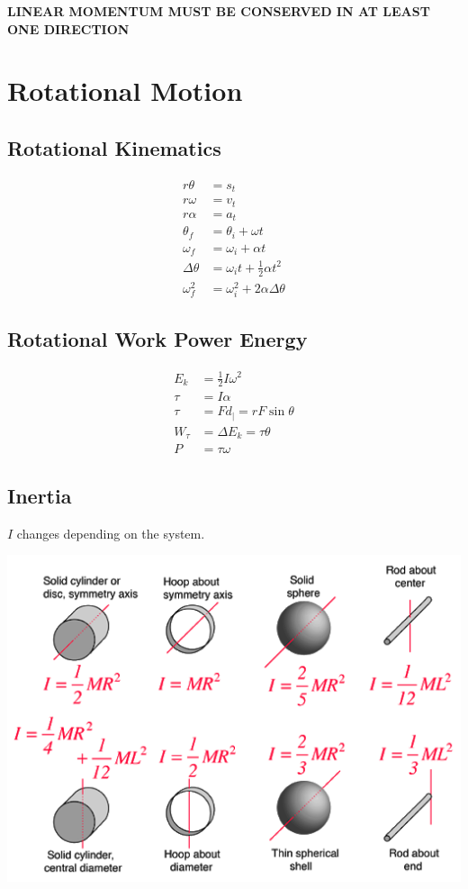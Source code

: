 \documentclass[letterpaper,10pt]{article}
\begin{document}
\begin{multicols}{2}
\medskip
\begin{center}
    \textbf{LINEAR MOMENTUM MUST BE CONSERVED IN AT LEAST ONE DIRECTION}
\end{center}

\section{Rotational Motion}
\subsection{Rotational Kinematics}
\begin{align*}
    r \theta &= s_t \\
    r \omega &= v_t \\
    r \alpha &= a_t \\
    \theta_f &= \theta_i + \omega t \\
    \omega_f &= \omega_i + \alpha t \\
    \Delta \theta &= \omega_i t + \tfrac{1}{2} \alpha t^2 \\
    \omega_f^2 &= \omega_i^2 + 2 \alpha \Delta \theta
\end{align*}

\subsection{Rotational Work Power Energy}
\begin{align*}
    E_k &= \tfrac{1}{2} I \omega^2 \\
    \tau &= I \alpha \\
    \tau &= F d_| = r F \sin \theta \\
    W_\tau &= \Delta E_k = \tau \theta \\
    P &= \tau \omega
\end{align*}

\subsection{Inertia}
$I$ changes depending on the system.

\begin{center}
    \includegraphics[width=\linewidth]{moment-of-inertia.png}
\end{center}


\end{multicols}
\end{document}
